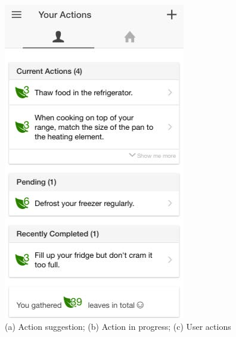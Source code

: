 \begin{figure}[b!]
\begin{center}
\begin{minipage}[t!]{0.33\linewidth}
         \includegraphics[width=1\linewidth]{img/action_tab.jpg}    
        \end{minipage}
      \end{center}
      \caption{(a) Action suggestion; (b) Action in progress; (c) User actions}\label{fig:actions}
\end{figure}



